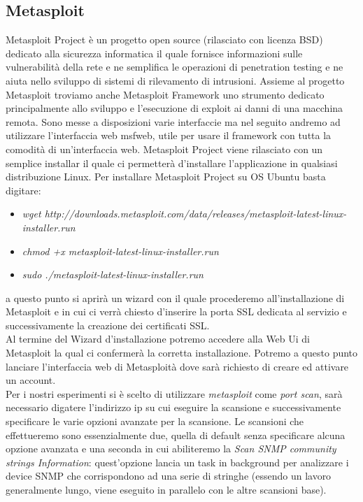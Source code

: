 	\subsection{Metasploit}
	Metasploit Project è un progetto open source (rilasciato con licenza BSD) dedicato alla sicurezza informatica il quale fornisce informazioni sulle vulnerabilità della rete e ne semplifica le operazioni di penetration testing e ne aiuta nello sviluppo di sistemi di rilevamento di intrusioni.
	Assieme al progetto Metasploit troviamo anche Metasploit Framework uno strumento dedicato principalmente allo sviluppo e l'esecuzione di exploit ai danni di una macchina remota.
	Sono messe a disposizioni varie interfaccie ma nel seguito andremo ad utilizzare l'interfaccia web msfweb, utile per usare il framework con tutta la comodità di un'interfaccia web.
	Metasploit Project viene rilasciato con un semplice installar il quale ci permetterà d'installare l'applicazione in qualsiasi distribuzione Linux.
	Per installare Metasploit Project su OS Ubuntu basta digitare:
	\begin{itemize}
	\item \textit{wget http://downloads.metasploit.com/data/releases/metasploit-latest-linux-installer.run}
	\item \textit{chmod +x metasploit-latest-linux-installer.run}
	\item \textit{sudo ./metasploit-latest-linux-installer.run}
	\end{itemize}
	a questo punto si aprirà un wizard con il quale procederemo all'installazione di Metasploit e in cui ci verrà chiesto d'inserire la porta SSL dedicata al servizio e successivamente la creazione dei certificati SSL.\\
	Al termine del Wizard d'installazione potremo accedere alla Web Ui di Metasploit la qual ci confermerà la corretta installazione. Potremo a questo punto lanciare l'interfaccia web di Metasploità dove sarà richiesto di creare ed attivare un account.\\
	Per i nostri esperimenti si è scelto di utilizzare \textit{metasploit} come \textit{port scan}, sarà necessario digatere l'indirizzo ip su cui eseguire la scansione e successivamente specificare le varie opzioni avanzate per la scansione. Le scansioni che effettueremo sono essenzialmente due, quella di default senza specificare alcuna opzione avanzata e una seconda in cui abiliteremo la \textit{Scan SNMP community strings Information}: quest'opzione lancia un task in background per analizzare i device SNMP che corrispondono ad una serie di stringhe (essendo un lavoro generalmente lungo, viene eseguito in parallelo con le altre scansioni base).
	
